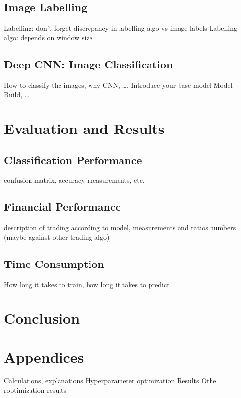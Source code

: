 \documentclass[11pt, a4paper]{article}
\begin{document}
\subsection{Image Labelling}
Labelling: don't forget discrepancy in labelling algo vs image labels
Labelling algo: depends on window size

\subsection{Deep CNN: Image Classification}
How to classify the images, why CNN, \dots, 
Introduce your base model
Model Build, \dots

\section{Evaluation and Results}
\subsection{Classification Performance}
confusion matrix, accuracy measurements, etc.

\subsection{Financial Performance}
description of trading according to model, measurements and ratios
numbers (maybe against other trading algo)

\subsection{Time Consumption}
How long it takes to train, how long it takes to predict

\section{Conclusion}

\section{Appendices}
Calculations, explanations
Hyperparameter optimization Results
Othe roptimization results
\end{document}
